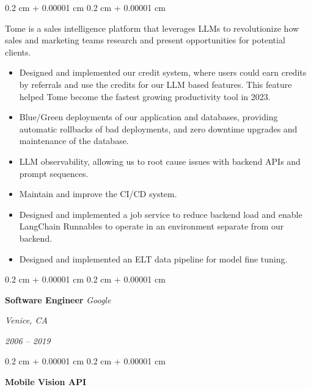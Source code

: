 \documentclass[12pt, letterpaper]{article}
\newenvironment{highlights}{
    \begin{itemize}[
        topsep=0.10 cm,
        parsep=0.10 cm,
        partopsep=0pt,
        itemsep=0pt,
        leftmargin=0.4 cm + 10pt
    ]
}{
    \end{itemize}
} %
\newenvironment{onecolentry}{
    \begin{adjustwidth}{
        0.2 cm + 0.00001 cm
    }{
        0.2 cm + 0.00001 cm
    }
}{
    \end{adjustwidth}
} %
\newenvironment{twocolentry}[2][]{
    \onecolentry
    \def\secondColumn{#2}
    \setcolumnwidth{\fill, 4.5 cm}
    \begin{paracol}{2}
}{
    \switchcolumn \raggedleft \secondColumn
    \end{paracol}
    \endonecolentry
} %
\begin{document}
        \vspace{0.10 cm}
        \begin{onecolentry}
            Tome is a sales intelligence platform that leverages LLMs to revolutionize how sales and marketing teams research and present opportunities for potential clients.
            \begin{highlights}
                \item Designed and implemented our credit system, where users could earn credits by referrals and use the credits for our LLM based features.  This feature helped Tome become the fastest growing productivity tool in 2023.
                \item Blue/Green deployments of our application and databases, providing automatic rollbacks of bad deployments, and zero downtime upgrades and maintenance of the database.
                \item LLM observability, allowing us to root cause issues with backend APIs and prompt sequences.
                \item Maintain and improve the CI/CD system.
                \item Designed and implemented a job service to reduce backend load and enable LangChain Runnables to operate in an environment separate from our backend.
                \item Designed and implemented an ELT data pipeline for model fine tuning.
            \end{highlights}
        \end{onecolentry}

        \vspace{0.2 cm}

        \begin{twocolentry}{
        \textit{Venice, CA}    
            
        \textit{2006 – 2019}}
            \textbf{Software Engineer}
            \textit{Google}
        \end{twocolentry}

        \vspace{0.10 cm}
        \begin{onecolentry}
            \textbf{Mobile Vision API}
        \end{onecolentry}
\end{document}

